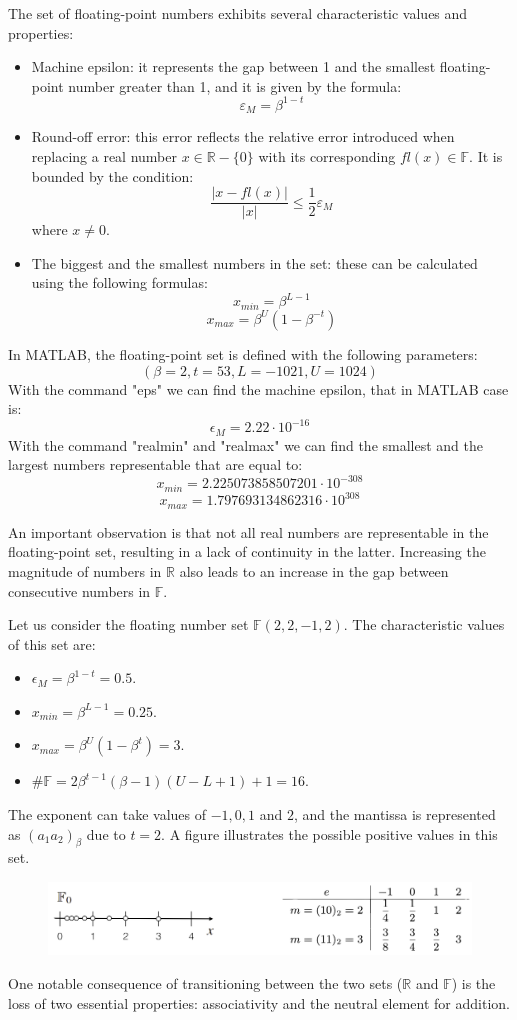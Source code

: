 The set of floating-point numbers exhibits several characteristic values and properties:
\begin{itemize}
    \item Machine epsilon: it represents the gap between 1 and the smallest floating-point number greater than 1, and it is given by the formula:
        \[\varepsilon_M=\beta^{1-t}\]
    \item Round-off error: this error reflects the relative error introduced when replacing a real number $x \in \mathbb{R}-\{0\}$ with its corresponding $fl(x) \in \mathbb{F}$. 
        It is bounded by the condition:
        \[\dfrac{\left\lvert x-fl(x) \right\rvert}{\left\lvert x \right\rvert }\leq \dfrac{1}{2}\varepsilon_M\]
        where $x \neq 0$.
    \item The biggest and the smallest numbers in the set: these can be calculated using the following formulas:
        \[x_{min}=\beta^{L-1}\]
        \[x_{max}=\beta^U(1-\beta^{-t})\]
\end{itemize}
\begin{example}
    In MATLAB, the floating-point set is defined with the following parameters:
    \[(\beta=2,t=53,L=-1021,U=1024)\] 
    With the command "eps" we can find the machine epsilon, that in MATLAB case is:
    \[\epsilon_M=2.22 \cdot 10^{-16}\]
    With the command "realmin" and "realmax" we can find the smallest and the largest numbers representable that are equal to:
    \[x_{min}=2.225073858507201 \cdot 10^{-308}\]
    \[x_{max}=1.797693134862316 \cdot 10^{308}\]
\end{example}
An important observation is that not all real numbers are representable in the floating-point set, resulting in a lack of continuity in the latter. 
Increasing the magnitude of numbers in $\mathbb{R}$ also leads to an increase in the gap between consecutive numbers in $\mathbb{F}$. 
\begin{example}
    Let us consider the floating number set $\mathbb{F}(2,2,-1,2)$. 
    The characteristic values of this set are: 
    \begin{itemize}
        \item $\epsilon_M=\beta^{1-t}=0.5$.
        \item $x_{min}=\beta^{L-1}=0.25$.
        \item $x_{max}=\beta^U(1-\beta^t)=3$.
        \item $\#\mathbb{F}=2 \beta^{t-1}(\beta -1)(U-L+1)+1=16$. 
    \end{itemize}
    The exponent can take values of $-1,0,1$ and $2$, and the mantissa is represented as $(a_1a_2)_{\beta}$ due to $t=2$. 
    A figure illustrates the possible positive values in this set.
    \begin{figure}[H]
        \centering
        \includegraphics[width=0.9\linewidth]{images/numbers.png}
    \end{figure}
\end{example}
One notable consequence of transitioning between the two sets ($\mathbb{R}$ and $\mathbb{F}$) is the loss of two essential properties: associativity and the neutral element for addition.